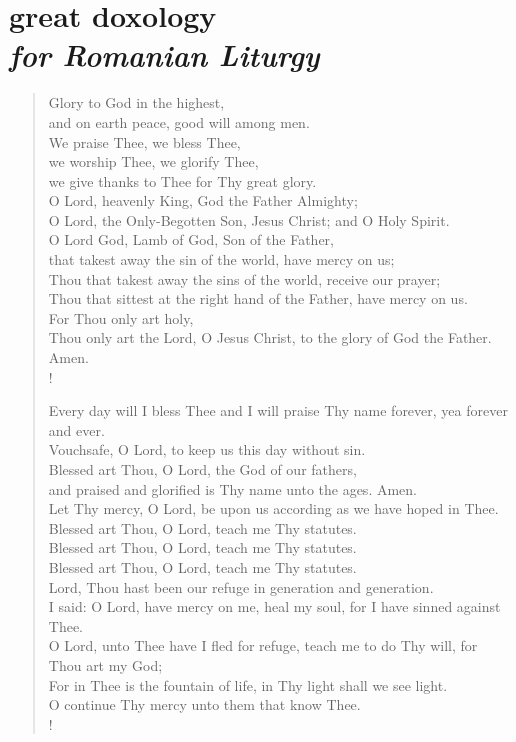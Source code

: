 \section[Section Title\\Section Subtitle]{great doxology \\{\normalfont \normalsize \textit{for Romanian Liturgy}}}

\begin{verse}
    Glory to God in the highest, \\
    and on earth peace, good will among men. \\
    We praise Thee, we bless Thee, \\
    we worship Thee, we glorify Thee, \\
    we give thanks to Thee for Thy great glory. \\
    O Lord, heavenly King, God the Father Almighty; \\
    O Lord, the Only-Begotten Son, Jesus Christ; and O Holy Spirit. \\
    O Lord God, Lamb of God, Son of the Father, \\
    that takest away the sin of the world, have mercy on us; \\
    Thou that takest away the sins of the world, receive our prayer; \\
    Thou that sittest at the right hand of the Father, have mercy on us. \\
    For Thou only art holy, \\
    Thou only art the Lord, O Jesus Christ, to the glory of God the Father. Amen. \\!

    Every day will I bless Thee and I will praise Thy name forever, yea forever and ever. \\
    Vouchsafe, O Lord, to keep us this day without sin. \\
    Blessed art Thou, O Lord, the God of our fathers, \\
    and praised and glorified is Thy name unto the ages. Amen. \\
    Let Thy mercy, O Lord, be upon us according as we have hoped in Thee. \\
    Blessed art Thou, O Lord, teach me Thy statutes. \\
    Blessed art Thou, O Lord, teach me Thy statutes. \\
    Blessed art Thou, O Lord, teach me Thy statutes. \\
    Lord, Thou hast been our refuge in generation and generation. \\
    I said: O Lord, have mercy on me, heal my soul, for I have sinned against Thee. \\
    O Lord, unto Thee have I fled for refuge, teach me to do Thy will, for Thou art my God; \\
    For in Thee is the fountain of life, in Thy light shall we see light. \\
    O continue Thy mercy unto them that know Thee. \\!


\end{verse}
